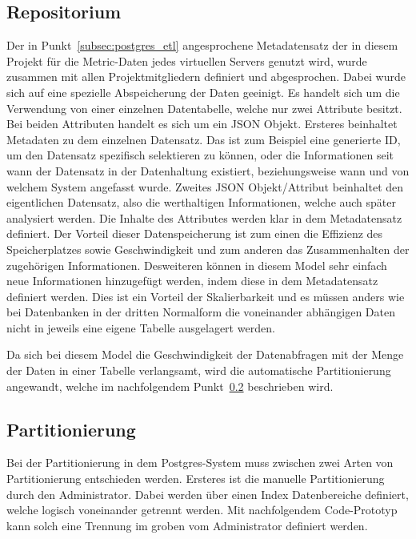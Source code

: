 \subsection{Repositorium}
\label{subsec:postgres_repositorium}
Der in Punkt~\ref{subsec:postgres_etl} angesprochene Metadatensatz der in
diesem Projekt für die Metric-Daten jedes virtuellen Servers genutzt wird,
wurde zusammen mit allen Projektmitgliedern definiert und abgesprochen.
Dabei wurde sich auf eine spezielle Abspeicherung der Daten geeinigt. Es
handelt sich um die Verwendung von einer einzelnen Datentabelle, welche
nur zwei Attribute besitzt. Bei beiden Attributen handelt es sich um ein
JSON Objekt. Ersteres beinhaltet Metadaten zu dem einzelnen Datensatz.
Das ist zum Beispiel eine generierte ID, um den Datensatz spezifisch
selektieren zu können, oder die Informationen seit wann der Datensatz
in der Datenhaltung existiert, beziehungsweise wann und von welchem System
angefasst wurde. Zweites JSON Objekt/Attribut beinhaltet den eigentlichen
Datensatz, also die werthaltigen Informationen, welche auch später analysiert
werden. Die Inhalte des Attributes werden klar in dem Metadatensatz definiert.
Der Vorteil dieser Datenspeicherung ist zum einen die Effizienz des
Speicherplatzes sowie Geschwindigkeit und zum anderen das Zusammenhalten der
zugehörigen Informationen. Desweiteren können in diesem Model sehr einfach neue
Informationen hinzugefügt werden, indem diese in dem Metadatensatz definiert
werden. Dies ist ein Vorteil der Skalierbarkeit und es müssen anders wie bei
Datenbanken in der dritten Normalform die voneinander abhängigen Daten nicht
in jeweils eine eigene Tabelle ausgelagert werden.

Da sich bei diesem Model die Geschwindigkeit der Datenabfragen mit der Menge
der Daten in einer Tabelle verlangsamt, wird die automatische Partitionierung
angewandt, welche im nachfolgendem Punkt~\ref{subsec:postgres_partition}
beschrieben wird.
\nl%

\subsection{Partitionierung}
\label{subsec:postgres_partition}
Bei der Partitionierung in dem Postgres-System muss zwischen zwei Arten von
Partitionierung entschieden werden. Ersteres ist die manuelle Partitionierung
durch den Administrator. Dabei werden über einen Index Datenbereiche definiert,
welche logisch voneinander getrennt werden. Mit nachfolgendem Code-Prototyp
kann solch eine Trennung im groben vom Administrator definiert werden.

